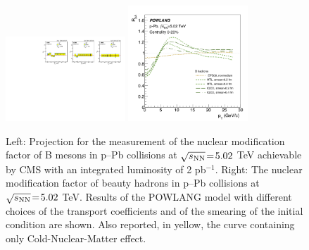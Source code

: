 \begin{figure}[ht]
\centering
\includegraphics[trim=0 0 13cm 0,clip,width=0.4\textwidth]{hf/figures/cRpA_lumiTG_2000.pdf}
\includegraphics[width=0.4\textwidth]{hf/figures/Beauty-RpPb5TeV-HTLvsLat.png}
\caption{Left: Projection for the measurement of the nuclear modification factor of B mesons in p--Pb collisions at $\sqrt{s_{\rm NN}}\!=\!5.02$ TeV achievable by CMS with an integrated luminosity of 2 pb$^{-1}$.
Right: The nuclear modification factor of beauty hadrons in p--Pb collisions at $\sqrt{s_{\rm NN}}\!=\!5.02$ TeV. Results of the POWLANG model with different choices of the transport coefficients and of the smearing of the initial condition are shown. Also reported, in yellow, the curve containing only Cold-Nuclear-Matter effect.}
\label{fig:POWLANG-small1}
\end{figure}
